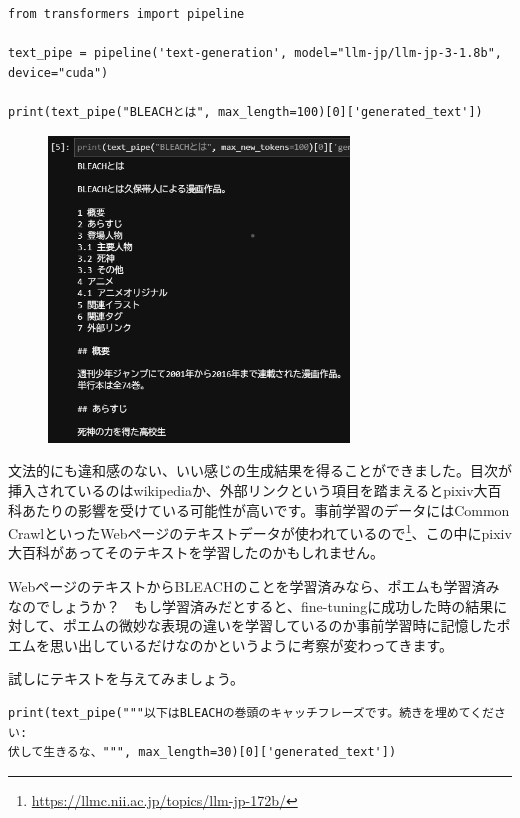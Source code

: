 \documentclass[a5paper,twoside,dvipdfmx]{jsarticle}
\begin{document}
\begin{lstlisting}
from transformers import pipeline

text_pipe = pipeline('text-generation', model="llm-jp/llm-jp-3-1.8b", device="cuda")

print(text_pipe("BLEACHとは", max_length=100)[0]['generated_text'])
\end{lstlisting}

\begin{figure}[h]
  \centering
  \includegraphics[width=80mm]{../C105Fig/gray/generate.png}
 \end{figure} 

\newpage

文法的にも違和感のない、いい感じの生成結果を得ることができました。目次が挿入されているのはwikipediaか、外部リンクという項目を踏まえるとpixiv大百科あたりの影響を受けている可能性が高いです。事前学習のデータにはCommon CrawlといったWebページのテキストデータが使われているので\footnote{\url{https://llmc.nii.ac.jp/topics/llm-jp-172b/}}、この中にpixiv大百科があってそのテキストを学習したのかもしれません。

WebページのテキストからBLEACHのことを学習済みなら、ポエムも学習済みなのでしょうか？　もし学習済みだとすると、fine-tuningに成功した時の結果に対して、ポエムの微妙な表現の違いを学習しているのか事前学習時に記憶したポエムを思い出しているだけなのかというように考察が変わってきます。

試しにテキストを与えてみましょう。

\begin{lstlisting}
print(text_pipe("""以下はBLEACHの巻頭のキャッチフレーズです。続きを埋めてください: 
伏して生きるな、""", max_length=30)[0]['generated_text'])
\end{lstlisting}
\end{document}
